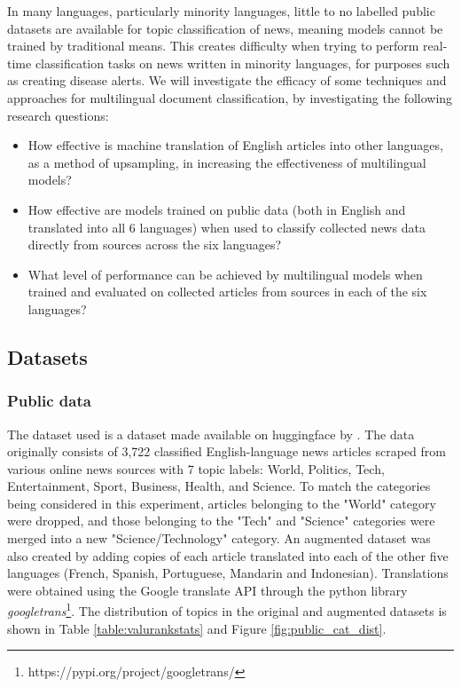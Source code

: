 \documentclass{l4proj}
\begin{document}
In many languages, particularly minority languages, little to no labelled public datasets are available for topic classification of news, meaning models cannot be trained by traditional means. This creates difficulty when trying to perform real-time classification tasks on news written in minority languages, for purposes such as creating disease alerts. We will investigate the efficacy of some techniques and approaches for multilingual document classification, by investigating the following research questions: 
\begin{itemize}
\item How effective is machine translation of English articles into other languages, as a method of upsampling, in increasing the effectiveness of multilingual models? 
\item How effective are models trained on public data (both in English and translated into all 6 languages) when used to classify collected news data directly from sources across the six languages? 
\item What level of performance can be achieved by multilingual models when trained and evaluated on collected articles from sources in each of the six languages?
\end{itemize}

\subsection{Datasets}
\subsubsection{Public data} \hfill \par
The dataset used is a dataset made available on huggingface by \cite{valurankdata}. The data originally consists of 3,722 classified English-language news articles scraped from various online news sources with 7 topic labels: World, Politics, Tech, Entertainment, Sport, Business, Health, and Science. To match the categories being considered in this experiment, articles belonging to the "World" category were dropped, and those belonging to the "Tech" and "Science" categories were merged into a new "Science/Technology" category. An augmented dataset was also created by adding copies of each article translated into each of the other five languages (French, Spanish, Portuguese, Mandarin and Indonesian). Translations were obtained using the Google translate API through the python library \emph{googletrans}\footnote{https://pypi.org/project/googletrans/}. The distribution of topics in the original and augmented datasets is shown in Table \ref{table:valurankstats} and Figure \ref{fig:public_cat_dist}.
\end{document}
